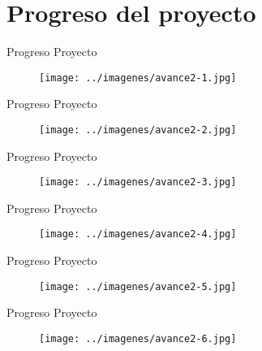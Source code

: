 \documentclass{beamer}
\begin{document}
\section{Progreso del proyecto}\label{progreso-del-proyecto}
\begin{frame}{Progreso Proyecto}

\begin{figure}
\centering
\texttt{[image: ../imagenes/avance2-1.jpg]}
\end{figure}

\end{frame}
\begin{frame}{Progreso Proyecto}

\begin{figure}
\centering
\texttt{[image: ../imagenes/avance2-2.jpg]}
\end{figure}

\end{frame}
\begin{frame}{Progreso Proyecto}

\begin{figure}
\centering
\texttt{[image: ../imagenes/avance2-3.jpg]}
\end{figure}

\end{frame}
\begin{frame}{Progreso Proyecto}

\begin{figure}
\centering
\texttt{[image: ../imagenes/avance2-4.jpg]}
\end{figure}

\end{frame}
\begin{frame}{Progreso Proyecto}

\begin{figure}
\centering
\texttt{[image: ../imagenes/avance2-5.jpg]}
\end{figure}

\end{frame}

\begin{frame}{Progreso Proyecto}

\begin{figure}
\centering
\texttt{[image: ../imagenes/avance2-6.jpg]}
\end{figure}

\end{frame}
\end{document}
